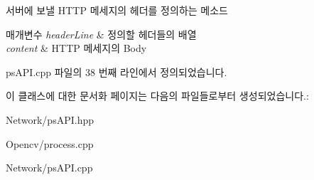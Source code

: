 서버에 보낼 H\+T\+TP 메세지의 헤더를 정의하는 메소드 


\begin{DoxyParams}{매개변수}
{\em header\+Line} & 정의할 헤더들의 배열 \\
\hline
{\em content} & H\+T\+TP 메세지의 Body \\
\hline
\end{DoxyParams}


ps\+A\+P\+I.\+cpp 파일의 38 번째 라인에서 정의되었습니다.



이 클래스에 대한 문서화 페이지는 다음의 파일들로부터 생성되었습니다.\+:\begin{DoxyCompactItemize}
\item 
Network/ps\+A\+P\+I.\+hpp\item 
Opencv/process.\+cpp\item 
Network/ps\+A\+P\+I.\+cpp\end{DoxyCompactItemize}

